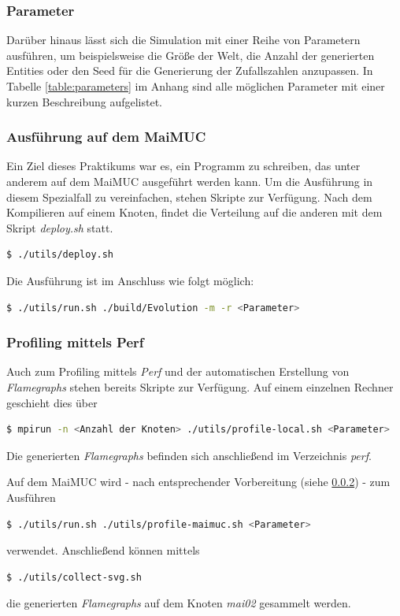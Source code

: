 \documentclass[course=erap]{aspdoc}
\begin{document}
\subsubsection{Parameter}
\label{sssec:exec-params}
Darüber hinaus lässt sich die Simulation mit einer Reihe von Parametern ausführen, um beispielsweise die Größe der Welt, die Anzahl der generierten Entities oder den Seed für die Generierung der Zufallszahlen anzupassen. In Tabelle \ref{table:parameters} im Anhang sind alle möglichen Parameter mit einer kurzen Beschreibung aufgelistet.

\subsubsection{Ausführung auf dem MaiMUC}
\label{sssec:exec-maimuc}
Ein Ziel dieses Praktikums war es, ein Programm zu schreiben, das unter anderem auf dem MaiMUC ausgeführt werden kann. Um die Ausführung in diesem Spezialfall zu vereinfachen, stehen Skripte zur Verfügung. Nach dem Kompilieren auf einem Knoten, findet die Verteilung auf die anderen mit dem Skript \emph{deploy.sh} statt.
\begin{lstlisting}[language=bash]
  $ ./utils/deploy.sh
\end{lstlisting}
Die Ausführung ist im Anschluss wie folgt möglich:
\begin{lstlisting}[language=bash]
  $ ./utils/run.sh ./build/Evolution -m -r <Parameter>
\end{lstlisting}

\subsubsection{Profiling mittels Perf}
Auch zum Profiling mittels \emph{Perf} und der automatischen Erstellung von \emph{Flamegraphs} stehen bereits Skripte zur Verfügung. Auf einem einzelnen Rechner geschieht dies über
\begin{lstlisting}[language=bash]
  $ mpirun -n <Anzahl der Knoten> ./utils/profile-local.sh <Parameter>
\end{lstlisting}
Die generierten \emph{Flamegraphs} befinden sich anschließend im Verzeichnis \emph{perf}.

Auf dem MaiMUC wird - nach entsprechender Vorbereitung (siehe \ref{sssec:exec-maimuc}) - zum Ausführen
\begin{lstlisting}[language=bash]
  $ ./utils/run.sh ./utils/profile-maimuc.sh <Parameter>
\end{lstlisting}
verwendet. Anschließend können mittels
\begin{lstlisting}[language=bash]
  $ ./utils/collect-svg.sh
\end{lstlisting}
die generierten \emph{Flamegraphs} auf dem Knoten \emph{mai02} gesammelt werden.
\end{document}
